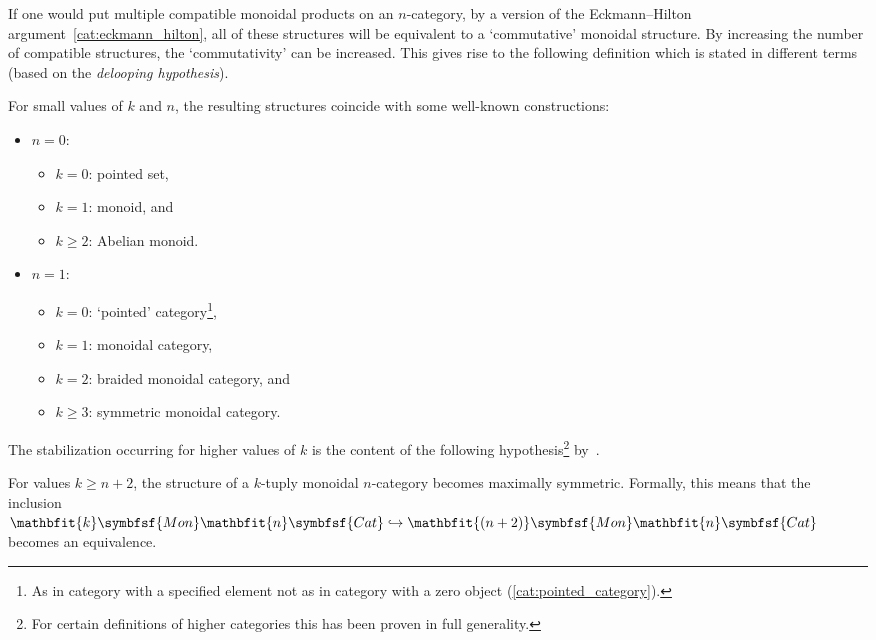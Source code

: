     If one would put multiple compatible monoidal products on an $n$-category, by a version of the Eckmann--Hilton argument~\ref{cat:eckmann_hilton}, all of these structures will be equivalent to a `commutative' monoidal structure. By increasing the number of compatible structures, the `commutativity' can be increased. This gives rise to the following definition which is stated in different terms (based on the \textit{delooping hypothesis}).

    \begin{example}
        For small values of $k$ and $n$, the resulting structures coincide with some well-known constructions:
        \begin{itemize}
            \item $n=0$:
                \begin{itemize}
                    \item $k=0$: pointed set,
                    \item $k=1$: monoid, and
                    \item $k\geq2$: Abelian monoid.
                \end{itemize}
            \item $n=1$:
                \begin{itemize}
                    \item $k=0$: `pointed' category\footnote{As in category with a specified element not as in category with a zero object (\cref{cat:pointed_category}).},
                    \item $k=1$: monoidal category,
                    \item $k=2$: braided monoidal category, and
                    \item $k\geq3$: symmetric monoidal category.
                \end{itemize}
        \end{itemize}
    \end{example}
    The stabilization occurring for higher values of $k$ is the content of the following hypothesis\footnote{For certain definitions of higher categories this has been proven in full generality.} by~\citet{baez_higherdimensional_1995}.
    \begin{theorem}
        For values $k\geq n+2$, the structure of a $k$-tuply monoidal $n$-category becomes maximally symmetric. Formally, this means that the inclusion \emph{$\mathbfit{k}\symbfsf{Mon}\mathbfit{n}\symbfsf{Cat}\hookrightarrow\mathbfit{(n+2)}\symbfsf{Mon}\mathbfit{n}\symbfsf{Cat}$} becomes an equivalence.
    \end{theorem}


